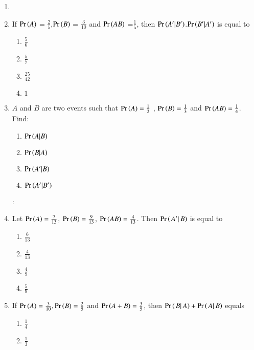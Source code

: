 \begin{enumerate}[label=\thesection.\arabic*,ref=\thesection.\theenumi]

\item 
\item If $\Pr\left(A\right)$ = $\frac{2}{5}$,$\Pr\left(B\right)$ = $\frac{3}{10}$ and $\Pr\left(AB\right)$ =$ \frac{1}{5}$, then $\Pr\left(A^{\prime}|B^{\prime}\right)$.$\Pr\left(B^{\prime}|A^{\prime}\right)$ is equal to \\
\begin{enumerate}[label=(\Alph*)]
\item 
$\frac{5}{6}$\\
\item 
$\frac{5}{7}$\\
\item 
$\frac{25}{42}$\\
\item 
$1$

\end{enumerate}
\item $A$ and $B$ are two events such that $\Pr\left(A\right)= \frac{1}{2}$ , $\Pr\left(B\right)= \frac{1}{3}$ and $\Pr\left(AB\right)= \frac{1}{4}$.\\
Find:
\begin{enumerate}[label =\roman*]
\item $\Pr\left(A|B\right)$  \item $\Pr\left(B|A\right)$  \item $\Pr\left(A^{\prime}|B\right)$  \item $\Pr\left(A^{\prime}|B^{\prime}\right)$
\end{enumerate}
\solution:\\

\item Let $\Pr\left(A\right) = \frac{7}{13}$, $\Pr\left(B\right) = \frac{9}{13}$, $\Pr\left(AB\right) = \frac{4}{13}$. Then $\Pr\left(\left.A^{\prime}\right |B\right)$ is equal to
\begin{enumerate}[label=(\alph*)]
\item $\frac{6}{13}$
\item $\frac{4}{13}$
\item $\frac{4}{9}$
\item $\frac{5}{9}$
\end{enumerate}

\item If $\Pr\left(A\right) = \frac{3}{10}, \Pr\left(B\right) = \frac{2}{5}$ and $\Pr\left(A+B\right) = \frac{3}{5}$, then $\Pr\left(\left. B \right| A\right) + \Pr\left(\left. A \right| B\right) $ equals
\begin{enumerate}
	\item $\frac{1}{4}$ \vspace{2pt}
	\item $\frac{1}{3}$ \vspace {2pt}

\end{enumerate}
\end{enumerate}
